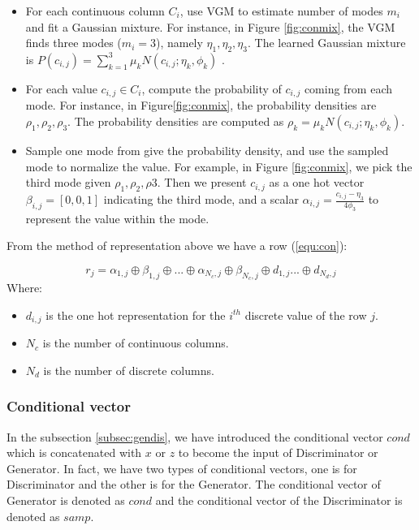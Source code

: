 \documentclass{article}
\begin{document}
\begin{itemize}
	\item For each continuous column $C_i$, use \ac{VGM} \cite{bishop2006pattern} to estimate number of modes $m_i$ and fit a Gaussian mixture. For instance, in Figure \ref{fig:conmix}, the \ac{VGM} finds three modes ($m_i = 3$), namely $\eta_1, \eta_2, \eta_3$. The learned Gaussian mixture is $\mathit{P}(c_{i, j}) = \sum_{k=1}^{3}\mu_k\mathit{N}(c_{i,j}; \eta_k, \phi_k)$ .
	\item For each value $c_{i,j} \in C_i$, compute the probability of $c_{i,j}$ coming from each mode. For instance, in Figure\ref{fig:conmix}, the probability densities are $\rho_1, \rho_2, \rho_3$. The probability densities are computed as $\rho_k = \mu_k\mathit{N}(c_{i,j}; \eta_k, \phi_k)$.
	\item Sample one mode from give the probability density, and use the sampled mode to normalize the value. For example, in Figure \ref{fig:conmix}, we pick the third mode given $\rho_1, \rho_2, \rho3$. Then we present $c_{i,j}$ as a one hot vector $\beta_{i,j} = [0, 0, 1]$ indicating the third mode, and a scalar $\alpha_{i,j}= \frac{c_{i,j} - \eta_3}{4 \phi_3}$ to represent the value within the mode. 
\end{itemize}

From the method of representation above we have a row (\ref{equ:con}):

\begin{equation}\label{equ:con}
	r_j = \alpha_{1,j} \oplus \beta_{1,j} \oplus ... \oplus\alpha_{N_c, j} \oplus \beta_{N_c,j} \oplus d_{1, j} ... \oplus d_{N_d, j}
\end{equation}
Where:
\begin{itemize}
	\item $d_{i,j}$ is the one hot representation for the $i^{th}$ discrete value of the row $j$.
	\item ${N_c}$ is the number of continuous columns.
	\item ${N_d}$ is the number of discrete columns.
\end{itemize}

\subsubsection{Conditional vector}

In the subsection \ref{subsec:gendis}, we have introduced the conditional vector $cond$ which is concatenated with $x$ or $z$ to become the input of Discriminator or Generator. In fact, we have two types of conditional vectors, one is for Discriminator and the other is for the Generator. The conditional vector of Generator is denoted as $cond$ and the conditional vector of the Discriminator is denoted as $samp$.
\end{document}
